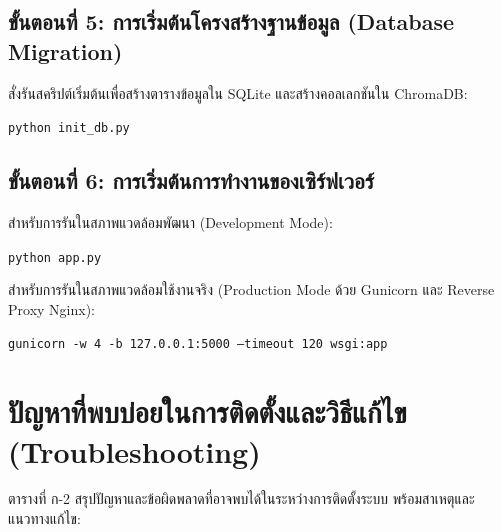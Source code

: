 \subsection{ขั้นตอนที่ 5: การเริ่มต้นโครงสร้างฐานข้อมูล (Database Migration)}
\hspace*{1.3em}
สั่งรันสคริปต์เริ่มต้นเพื่อสร้างตารางข้อมูลใน SQLite และสร้างคอลเลกชันใน ChromaDB:
\begin{mycustomitem}
\item \texttt{python init\_db.py}
\end{mycustomitem}

\subsection{ขั้นตอนที่ 6: การเริ่มต้นการทำงานของเซิร์ฟเวอร์}
\hspace*{1.3em}
สำหรับการรันในสภาพแวดล้อมพัฒนา (Development Mode):
\begin{mycustomitem}
\item \texttt{python app.py}
\end{mycustomitem}
\hspace*{1.3em}
สำหรับการรันในสภาพแวดล้อมใช้งานจริง (Production Mode ด้วย Gunicorn และ Reverse Proxy Nginx):
\begin{mycustomitem}
\item \texttt{gunicorn -w 4 -b 127.0.0.1:5000 --timeout 120 wsgi:app}
\end{mycustomitem}

\section{ปัญหาที่พบบ่อยในการติดตั้งและวิธีแก้ไข (Troubleshooting)}
\hspace*{1.3em}
ตารางที่ ก-2 สรุปปัญหาและข้อผิดพลาดที่อาจพบได้ในระหว่างการติดตั้งระบบ พร้อมสาเหตุและแนวทางแก้ไข:

